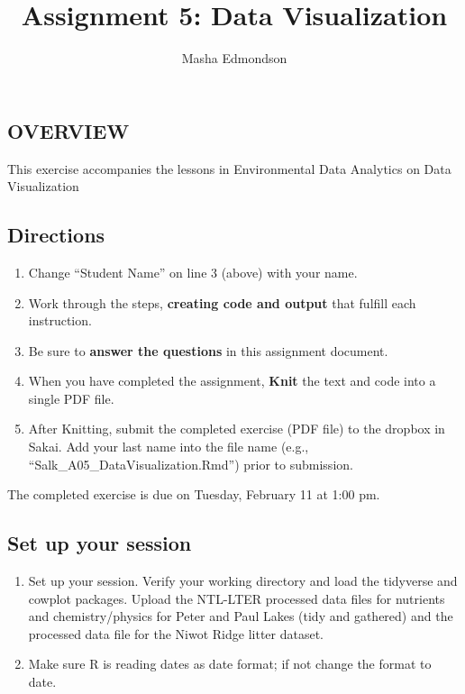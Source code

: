 \documentclass[]{article}
\title{Assignment 5: Data Visualization}
\author{Masha Edmondson}
\date{}
\providecommand{\tightlist}{%
  \setlength{\itemsep}{0pt}\setlength{\parskip}{0pt}}
\begin{document}
\maketitle

\hypertarget{overview}{%
\subsection{OVERVIEW}\label{overview}}

This exercise accompanies the lessons in Environmental Data Analytics on
Data Visualization

\hypertarget{directions}{%
\subsection{Directions}\label{directions}}

\begin{enumerate}
\def\labelenumi{\arabic{enumi}.}
\tightlist
\item
  Change ``Student Name'' on line 3 (above) with your name.
\item
  Work through the steps, \textbf{creating code and output} that fulfill
  each instruction.
\item
  Be sure to \textbf{answer the questions} in this assignment document.
\item
  When you have completed the assignment, \textbf{Knit} the text and
  code into a single PDF file.
\item
  After Knitting, submit the completed exercise (PDF file) to the
  dropbox in Sakai. Add your last name into the file name (e.g.,
  ``Salk\_A05\_DataVisualization.Rmd'') prior to submission.
\end{enumerate}

The completed exercise is due on Tuesday, February 11 at 1:00 pm.

\hypertarget{set-up-your-session}{%
\subsection{Set up your session}\label{set-up-your-session}}

\begin{enumerate}
\def\labelenumi{\arabic{enumi}.}
\item
  Set up your session. Verify your working directory and load the
  tidyverse and cowplot packages. Upload the NTL-LTER processed data
  files for nutrients and chemistry/physics for Peter and Paul Lakes
  (tidy and gathered) and the processed data file for the Niwot Ridge
  litter dataset.
\item
  Make sure R is reading dates as date format; if not change the format
  to date.
\end{enumerate}
\end{document}
